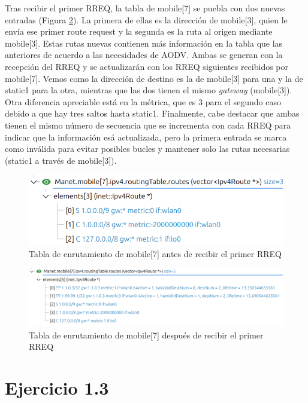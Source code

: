Tras recibir el primer RREQ, la tabla de mobile[7] se puebla con dos nuevas entradas (Figura \ref{fig:rtable_post_mob7}). La primera de ellas es la dirección de mobile[3], quien le envía ese primer route request y la segunda es la ruta al origen mediante mobile[3]. Estas rutas nuevas contienen más información en la tabla que las anteriores de acuerdo a las necesidades de AODV. Ambas se generan con la recepción del RREQ y se actualizarán con los RREQ siguientes recibidos por mobile[7]. Vemos como la dirección de destino es la de mobile[3] para una y la de static1 para la otra, mientras que las dos tienen el mismo \textit{gateway} (mobile[3]). Otra diferencia apreciable está en la métrica, que es 3 para el segundo caso debido a que hay tres saltos hasta static1. Finalmente, cabe destacar que ambas tienen el mismo número de secuencia que se incrementa con cada RREQ para indicar que la información esá actualizada, pero la primera entrada se marca como inválida para evitar posibles bucles y mantener solo las rutas necesarias (static1 a través de mobile[3]).

\begin{figure}[H]
    \centering
    \includegraphics[width=125mm, scale=0.75]{imaxes/ejercicio2_1.png}
    \caption{Tabla de enrutamiento de mobile[7] antes de recibir el primer RREQ}
    \label{fig:rtable_prev_mob7}
\end{figure}

\begin{figure}[H]
    \centering
    \includegraphics[width=125mm, scale=0.75]{imaxes/ejercicio2_2.png}
    \caption{Tabla de enrutamiento de mobile[7] después de recibir el primer RREQ}
    \label{fig:rtable_post_mob7}
\end{figure}

\vspace{1.25cm}
\section{Ejercicio 1.3}

